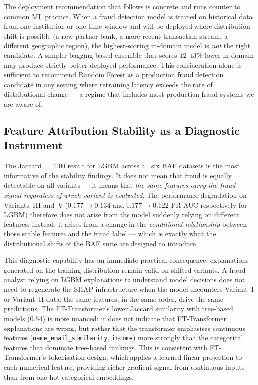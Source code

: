 \documentclass[a4paper,fleqn]{cas-sc}
\begin{document}
The deployment recommendation that follows is concrete and runs counter to
common ML practice.
When a fraud detection model is trained on historical data from one institution
or one time window and will be deployed where distribution shift is possible
(a new partner bank, a more recent transaction stream, a different geographic
region), the highest-scoring in-domain model is \emph{not} the right candidate.
A simpler bagging-based ensemble that scores $12$--$13\%$ lower in-domain
may produce strictly better deployed performance.
This consideration alone is sufficient to recommend Random Forest as a
production fraud detection candidate in any setting where retraining latency
exceeds the rate of distributional change --- a regime that includes most
production fraud systems we are aware of.

\subsection{Feature Attribution Stability as a Diagnostic Instrument}
\label{sec:disc_shap}

The Jaccard\,$=\,1.00$ result for LGBM across all six BAF datasets is the most
informative of the stability findings.
It does not mean that fraud is equally detectable on all variants --- it means
that \emph{the same features carry the fraud signal regardless of which variant
is evaluated}.
The performance degradation on Variants~III and~V ($0.177 \to 0.134$ and
$0.177 \to 0.122$ PR-AUC respectively for LGBM) therefore does not arise from
the model suddenly relying on different features; instead, it arises from a
change in the \emph{conditional relationship} between those stable features
and the fraud label --- which is exactly what the distributional shifts of the
BAF suite are designed to introduce.

This diagnostic capability has an immediate practical consequence: explanations
generated on the training distribution remain valid on shifted variants.
A fraud analyst relying on LGBM explanations to understand model decisions
does not need to regenerate the SHAP infrastructure when the model encounters
Variant~I or Variant~II data; the same features, in the same order, drive the same
predictions.
The FT-Transformer's lower Jaccard similarity with tree-based models ($0.54$)
is more nuanced: it does not indicate that FT-Transformer explanations are wrong,
but rather that the transformer emphasises continuous features
(\texttt{name\_email\_similarity}, \texttt{income}) more strongly than the
categorical features that dominate tree-based rankings.
This is consistent with FT-Transformer's tokenisation design, which applies a
learned linear projection to each numerical feature, providing richer gradient
signal from continuous inputs than from one-hot categorical embeddings.
\end{document}
